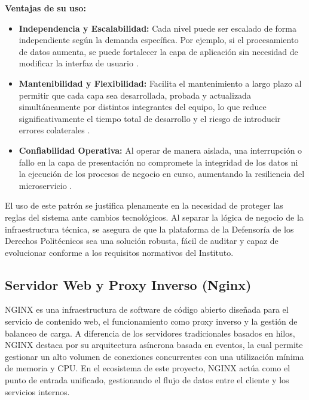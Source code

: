 \textbf{Ventajas de su uso:}
\begin{itemize}
\item \textbf{Independencia y Escalabilidad:} Cada nivel puede ser escalado de forma independiente según la demanda específica. Por ejemplo, si el procesamiento de datos aumenta, se puede fortalecer la capa de aplicación sin necesidad de modificar la interfaz de usuario \cite{33} \cite{42} .
\item \textbf{Mantenibilidad y Flexibilidad:} Facilita el mantenimiento a largo plazo al permitir que cada capa sea desarrollada, probada y actualizada simultáneamente por distintos integrantes del equipo, lo que reduce significativamente el tiempo total de desarrollo y el riesgo de introducir errores colaterales \cite{46} .
\item \textbf{Confiabilidad Operativa:} Al operar de manera aislada, una interrupción o fallo en la capa de presentación no compromete la integridad de los datos ni la ejecución de los procesos de negocio en curso, aumentando la resiliencia del microservicio \cite{46} .
\end{itemize}

El uso de este patrón se justifica plenamente en la necesidad de proteger las reglas del sistema ante cambios tecnológicos. Al separar la lógica de negocio de la infraestructura técnica, se asegura de que la plataforma de la Defensoría de los Derechos Politécnicos sea una solución robusta, fácil de auditar y capaz de evolucionar conforme a los requisitos normativos del Instituto.

\subsection{Servidor Web y Proxy Inverso (Nginx)}

NGINX es una infraestructura de software de código abierto diseñada para el servicio de contenido web, el funcionamiento como proxy inverso y la gestión de balanceo de carga. A diferencia de los servidores tradicionales basados en hilos, NGINX destaca por su arquitectura asíncrona basada en eventos, la cual permite gestionar un alto volumen de conexiones concurrentes con una utilización mínima de memoria y CPU. En el ecosistema de este proyecto, NGINX actúa como el punto de entrada unificado, gestionando el flujo de datos entre el cliente y los servicios internos.

